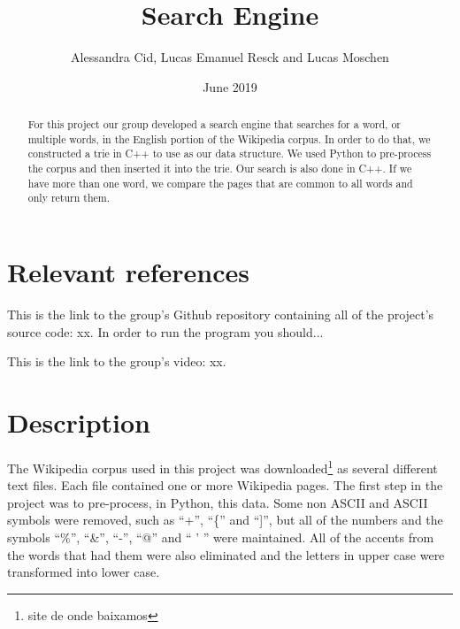 \documentclass{article}
\title{Search Engine}
\author{Alessandra Cid, Lucas Emanuel Resck  
and Lucas Moschen}
\date{June 2019}
\begin{document}
\maketitle

\begin{abstract}
For this project our group developed a search engine that searches for a word, or multiple words, in the English portion of the Wikipedia corpus. In order to do that, we constructed a trie in C++ to use as our data structure. We used Python to pre-process the corpus and then inserted it into the trie. Our search is also done in C++. If we have more than one word, we compare the pages that are common to all words and only return them. 
\end{abstract}

\section*{Relevant references}
This is the link to the group's Github repository containing all of the project's 
source code: xx. In order to run the program you should...

This is the link to the group's video: xx. 

\section*{Description}
The Wikipedia corpus used in this project was downloaded\footnote{site de onde baixamos}  as several different text files. Each file contained one or more Wikipedia pages. The first step in the project was to pre-process, in Python, this data. Some non ASCII and ASCII symbols were removed, such as ``+'', ``\{'' and ``]'', but all of the numbers and the symbols ``\%'', ``\&'', ``-'', ``@'' and `` ' '' were maintained. All of the accents from the words that had them were also eliminated and the letters in upper case were transformed into lower case. 
\end{document}
